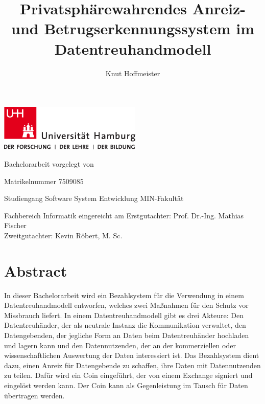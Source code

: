 \documentclass[
	fontsize=11pt,
	headings=small,
	parskip=half,           %
	bibliography=totoc,
	numbers=noenddot,       %
	open=any,               %
]{scrreprt}
\begin{document}
\title{Privatsphärewahrendes Anreiz- und Betrugserkennungssystem im\\ Datentreuhandmodell}
\author{Knut Hoffmeister}

\begin{titlepage}
\includegraphics[width=6.8cm]{up-uhh-logo-u-2010-u-farbe-u-rgb.pdf}
\begin{center}
    \vfill
    \Large Bachelorarbeit
    \vfill
    \makeatletter
    {\Large\textsf{\textbf{\@title}}}
    \makeatother
    \vfill
    vorgelegt von
    \par\bigskip
    \makeatletter
    {\@author}
    \makeatother
    \par
    Matrikelnummer 7509085 \par
    Studiengang Software System Entwicklung
    \vfill
    MIN-Fakultät \par
    Fachbereich Informatik
    \vfill
    \makeatletter
    eingereicht am {\@date}
    \makeatother
    \vfill
    Erstgutachter: Prof. Dr.-Ing. Mathias Fischer\\
    Zweitgutachter: Kevin Röbert, M. Sc.
\end{center}
\end{titlepage}

\restoregeometry

\tableofcontents

\chapter*{Abstract}
In dieser Bachelorarbeit wird ein Bezahlsystem für die Verwendung in einem Datentreuhandmodell entworfen, welches zwei Maßnahmen für den Schutz vor Missbrauch liefert. In einem Datentreuhandmodell gibt es drei Akteure: Den Datentreuhänder, der als neutrale Instanz die Kommunikation verwaltet, den Datengebenden, der jegliche Form an Daten beim Datentreuhänder hochladen und lagern kann und den Datennutzenden, der an der kommerziellen oder wissenschaftlichen Auswertung der Daten interessiert ist. Das Bezahlsystem dient dazu, einen Anreiz für Datengebende zu schaffen, ihre Daten mit Datennutzenden zu teilen. Dafür wird ein Coin eingeführt, der von einem Exchange signiert und eingelöst werden kann. Der Coin kann als Gegenleistung im Tausch für Daten übertragen werden.
\end{document}
